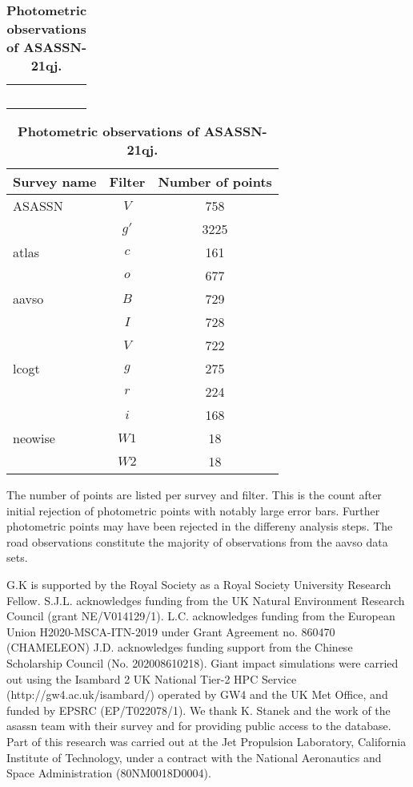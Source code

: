\documentclass[sn-nature,oneside]{sn-jnl}%
\begin{document}
\begin{table}
    \centering
    \caption{\textbf{Photometric observations of ASASSN-21qj.}}
    \begin{tabular}{p{}}
      \, \\
      \end{tabular}
      \vspace{-1em}
   \begin{tabular*}{0.7\textwidth}{l @{\extracolsep{\fill}}cc}
   \hline\hline
Survey name  & Filter & Number of points                    \\
       \hline
ASASSN   &  $V$   & 758 \\
  &  $g'$   & 3225 \\
       \hline
\gls{atlas} & $c$ & 161 \\
& $o$ & 677 \\
       \hline
\gls{aavso}   &  $B$   & 729 \\    %
  &  $I$   & 728 \\    %
  &  $V$   & 722 \\    %
       \hline
\gls{lcogt}   &  $g$   & 275 \\    %
  &  $r$   & 224 \\    %
  &  $i$   & 168 \\    %
       \hline
\gls{neowise} & $W1$ & 18 \\
& $W2$ & 18 \\
       \hline
   \end{tabular*}

\vspace{1em}
The number of points are listed per survey and filter.
%
This is the count after initial rejection of photometric points with notably large error bars.
%
Further photometric points may have been rejected in the differeny analysis steps.
%
The \gls{road} observations constitute the majority of observations from the \gls{aavso} data sets.

\label{tab:photometry}
\end{table}

\clearpage
{}

G.K is supported by the Royal Society as a Royal Society University Research Fellow.
%
S.J.L. acknowledges funding from the UK Natural Environment Research Council (grant NE/V014129/1).
%
L.C. acknowledges funding from the European Union H2020-MSCA-ITN-2019 under Grant Agreement no. 860470 (CHAMELEON)
%
J.D. acknowledges funding support from the Chinese Scholarship Council (No. 202008610218). Giant impact simulations were carried out using the Isambard 2 UK National Tier-2 HPC Service (http://gw4.ac.uk/isambard/) operated by GW4 and the UK Met Office, and funded by EPSRC (EP/T022078/1).
%
We thank K. Stanek and the work of the \gls{asassn} team with their survey and for providing public access to the database.
%
Part of this research was carried out at the Jet Propulsion Laboratory, California Institute of Technology, under a contract with the National Aeronautics and Space Administration (80NM0018D0004).
\end{document}
